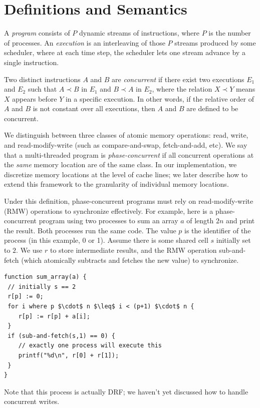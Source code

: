\documentclass{article}
\begin{document}
\section{Definitions and Semantics}

A \textit{program} consists of $P$ dynamic streams of instructions, where $P$ is the number of processes. An \textit{execution} is an interleaving of those $P$ streams produced by some scheduler, where at each time step, the scheduler lets one stream advance by a single instruction.

Two distinct instructions $A$ and $B$ are \textit{concurrent} if there exist two executions $E_1$ and $E_2$ such that $A \prec B$ in $E_1$ and $B \prec A$ in $E_2$, where the relation $X \prec Y$ means $X$ appears before $Y$ in a specific execution. In other words, if the relative order of $A$ and $B$ is not constant over all executions, then $A$ and $B$ are defined to be concurrent.

We distinguish between three classes of atomic memory operations: read, write, and read-modify-write (such as compare-and-swap, fetch-and-add, etc). We say that a multi-threaded program is \textit{phase-concurrent} if all concurrent operations at the \textit{same} memory location are of the same class. In our implementation, we discretize memory locations at the level of cache lines; we later describe how to extend this framework to the granularity of individual memory locations. 

Under this definition, phase-concurrent programs must rely on read-modify-write (RMW) operations to synchronize effectively. For example, here is a phase-concurrent program using two processes to sum an array $a$ of length $2n$ and print the result. Both processes run the same code. The value $p$ is the identifier of the process (in this example, 0 or 1). Assume there is some shared cell $s$ initially set to $2$. We use $r$ to store intermediate results, and the RMW operation sub-and-fetch (which atomically subtracts and fetches the new value) to synchronize.

\begin{lstlisting}
function sum_array(a) {
 // initially s == 2
 r[p] := 0;
 for i where p $\cdot$ n $\leq$ i < (p+1) $\cdot$ n {
 	r[p] := r[p] + a[i];
 }
 if (sub-and-fetch(s,1) == 0) {
 	// exactly one process will execute this
 	printf("%d\n", r[0] + r[1]);
 }
}
\end{lstlisting}

Note that this process is actually DRF; we haven't yet discussed how to handle concurrent writes.
\end{document}
